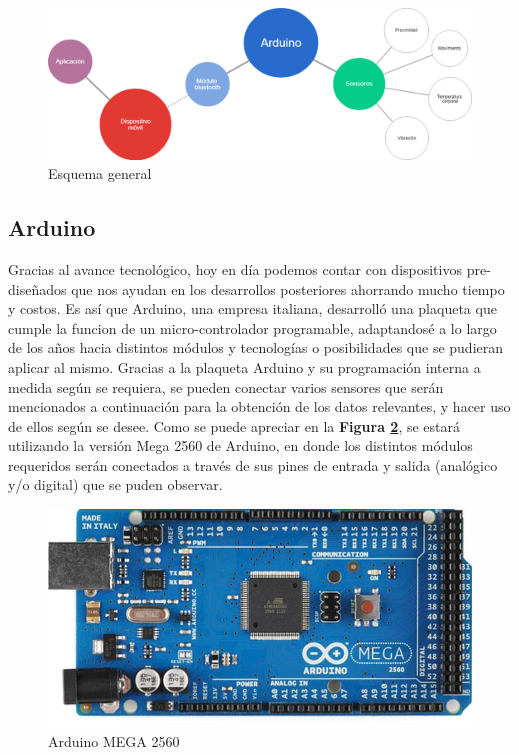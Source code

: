 \documentclass{IEEEtran}
\begin{document}
			\begin{figure}
				\centering
				\includegraphics[width=1\linewidth]{esquemageneral}
				\caption{Esquema general}
				\label{esquemageneral}
			\end{figure}

		\subsection{Arduino}

			Gracias al avance tecnológico, hoy en día podemos contar con dispositivos pre-diseñados que nos ayudan en los desarrollos posteriores ahorrando mucho tiempo y costos. Es así que Arduino, una empresa italiana, desarrolló una plaqueta que cumple la funcion de un micro-controlador programable, adaptandosé a lo largo de los años hacia distintos módulos y tecnologías o posibilidades que se pudieran aplicar al mismo. Gracias a la plaqueta Arduino y su programación interna a medida según se requiera, se pueden conectar varios sensores que serán mencionados a continuación para la obtención de los datos relevantes, y hacer uso de ellos según se desee. 
			Como se puede apreciar en la \textbf{Figura \ref{arduino-mega}}, se estará utilizando la versión Mega 2560 de Arduino, en donde los distintos módulos requeridos serán conectados a través de sus pines de entrada y salida (analógico y/o digital) que se puden observar.

			\begin{figure}
				\centering
				\includegraphics[width=1\linewidth]{arduino-mega}
				\caption{Arduino MEGA 2560}
				\label{arduino-mega}
			\end{figure}
\end{document}
